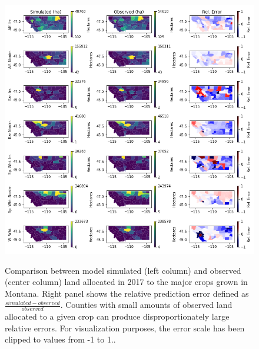 \begin{figure}
\includegraphics[width=\textwidth]{Figures/mean_land_use_2018.png}
\label{fig:map_land_change}
\caption{Comparison between model simulated (left column) and observed (center column) land allocated in 2017 to the major crops grown in Montana.  Right panel shows the relative prediction error defined as $\frac{simulated - observed}{observed}$. Counties with small amounts of observed land allocated to a given crop can produce disproportionately large relative errors. For visualization purposes, the error scale has been clipped to values from -1 to 1..}
\end{figure}



